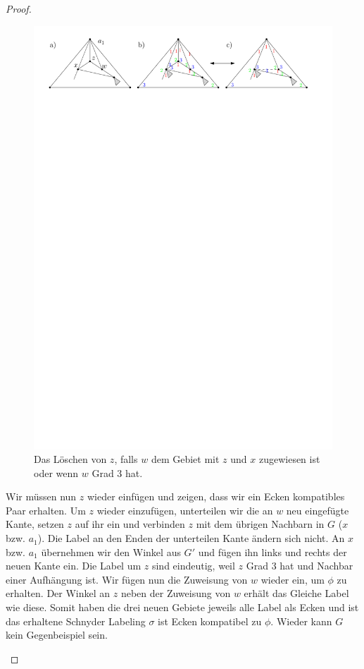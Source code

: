 \begin{proof}
\begin{description}[leftmargin =0pt, font = \bfseries]
\begin{figure}[h]
	\centering
	  \includegraphics[width=1\textwidth]{lem5_5.pdf}
    	\caption{Das Löschen von $z$, falls $w$ dem Gebiet mit $z$ und $x$ zugewiesen ist oder wenn $w$ Grad 3 hat.}
    	\label{pic_lem5_5}
\end{figure}

Wir müssen nun $z$ wieder einfügen und zeigen, dass wir ein Ecken kompatibles Paar erhalten. Um $z$ wieder einzufügen, unterteilen wir die an $w$ neu eingefügte Kante, setzen $z$ auf ihr ein und verbinden $z$ mit dem übrigen Nachbarn in $G$ ($x$ bzw. $a_1$). Die Label an den Enden der unterteilen Kante ändern sich nicht. An $x$ bzw. $a_1$ übernehmen wir den Winkel aus $G'$ und fügen ihn links und rechts der neuen Kante ein. Die Label um $z$ sind eindeutig, weil $z$ Grad 3 hat und Nachbar einer Aufhängung ist. Wir fügen nun die Zuweisung von $w$ wieder ein, um $\phi$ zu erhalten. Der Winkel an $z$ neben der Zuweisung von $w$ erhält das Gleiche Label wie diese. Somit haben die drei neuen Gebiete jeweils alle Label als Ecken und ist das erhaltene Schnyder Labeling $\sigma$ ist Ecken kompatibel zu $\phi$. Wieder kann $G$ kein Gegenbeispiel sein.


\end{description}
\end{proof}
